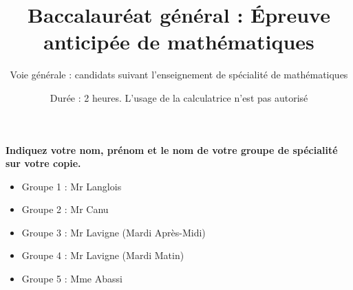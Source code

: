 \documentclass{controle}
\title{Baccalauréat général : Épreuve anticipée de mathématiques}
\author{Voie générale : candidats suivant l'enseignement de spécialité de mathématiques}
\date{Durée : 2 heures. L'usage de la calculatrice n'est pas autorisé}
\begin{document}
\begin{coverpages}
\maketitle
\begin{tcolorbox}
\textbf{Indiquez votre nom, prénom et le nom de votre groupe de spécialité sur votre copie.}
\begin{itemize}
\item Groupe 1 : Mr Langlois
\item Groupe 2 : Mr Canu
\item Groupe 3 : Mr Lavigne (Mardi Après-Midi) 
\item Groupe 4 : Mr Lavigne (Mardi Matin)
\item Groupe 5 : Mme Abassi
\end{itemize}
\end{tcolorbox}
\end{coverpages}
\end{document}
